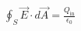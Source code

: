 \documentclass[preview]{standalone}
\begin{document}
\begin{align*}
\oint_S \vec{E} \cdot d\vec{A} = \frac{Q_{\text{in}}}{\epsilon_0}
\end{align*}
\end{document}
